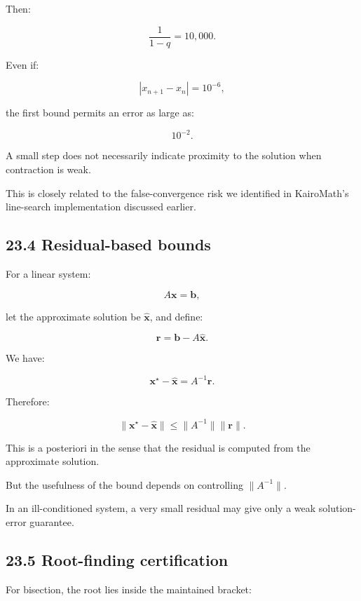 Then:

\[ \frac1{1-q}=10{,}000. \]

Even if:

\[ |x_{n+1}-x_n|=10^{-6}, \]

the first bound permits an error as large as:

\[ 10^{-2}. \]

A small step does not necessarily indicate proximity to the solution when contraction is weak.

This is closely related to the false-convergence risk we identified in KairoMath's line-search implementation discussed earlier.

\subsection{23.4 Residual-based bounds}\label{02-foundations-ii-ch028-residual-based-bounds}

\hypertarget{02-foundations-ii-ch028-residual-based-bounds}{}

For a linear system:

\[ A\mathbf x=\mathbf b, \]

let the approximate solution be \(\hat{\mathbf x}\), and define:

\[ \mathbf r=\mathbf b-A\hat{\mathbf x}. \]

We have:

\[ \mathbf x^\star-\hat{\mathbf x}=A^{-1}\mathbf r. \]

Therefore:

\[ \boxed{ \|\mathbf x^\star-\hat{\mathbf x}\| \le \|A^{-1}\|\|\mathbf r\| }. \]

This is a posteriori in the sense that the residual is computed from the approximate solution.

But the usefulness of the bound depends on controlling \(\|A^{-1}\|\).

In an ill-conditioned system, a very small residual may give only a weak solution-error guarantee.

\subsection{23.5 Root-finding certification}\label{02-foundations-ii-ch028-root-finding-certification}

\hypertarget{02-foundations-ii-ch028-root-finding-certification}{}

For bisection, the root lies inside the maintained bracket:

